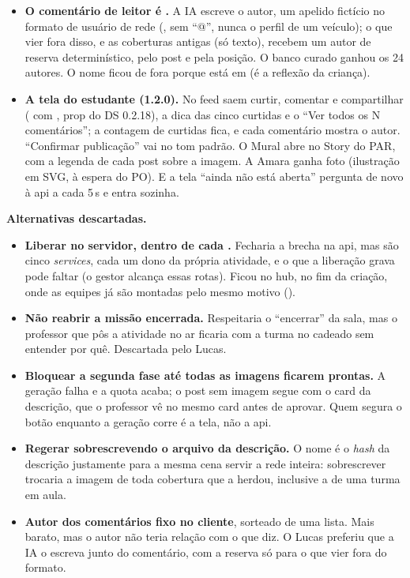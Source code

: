 \begin{itemize}
    Só antes da aprovação (409 ); post de gráfico,
    400 .
  \item \textbf{O comentário de leitor é .} A IA
    escreve o autor, um apelido fictício no formato de usuário de rede
    (, sem \enquote{@}, nunca o perfil de um
    veículo); o que vier fora disso, e as coberturas antigas (só texto),
    recebem um autor de reserva determinístico, pelo post e pela posição. O
    banco curado ganhou os 24 autores. O nome  ficou de fora porque
    está em  (é a reflexão da criança).
  \item \textbf{A tela do estudante (1.2.0).} No feed saem curtir, comentar e
    compartilhar ( com , prop do DS
    0.2.18), a dica das cinco curtidas e o \enquote{Ver todos os N
    comentários}; a contagem de curtidas fica, e cada comentário mostra o
    autor. \enquote{Confirmar publicação} vai no tom padrão. O Mural abre no
    Story do PAR, com a legenda de cada post sobre a imagem. A Amara ganha
    foto (ilustração em SVG, à espera do PO). E a tela \enquote{ainda não está
    aberta} pergunta de novo à api a cada 5\,s e entra sozinha.
\end{itemize}

\textbf{Alternativas descartadas.}

\begin{itemize}
  \item \textbf{Liberar no servidor, dentro de cada .}
    Fecharia a brecha na api, mas são cinco \emph{services}, cada um dono da
    própria atividade, e o  que a liberação grava pode faltar
    (o gestor alcança essas rotas). Ficou no hub, no fim da criação, onde as
    equipes já são montadas pelo mesmo motivo ().
  \item \textbf{Não reabrir a missão encerrada.} Respeitaria o
    \enquote{encerrar} da sala, mas o professor que pôs a atividade no ar
    ficaria com a turma no cadeado sem entender por quê. Descartada pelo
    Lucas.
  \item \textbf{Bloquear a segunda fase até todas as imagens ficarem prontas.}
    A geração falha e a quota acaba; o post sem imagem segue com o card da
    descrição, que o professor vê no mesmo card antes de aprovar. Quem segura o
    botão enquanto a geração corre é a tela, não a api.
  \item \textbf{Regerar sobrescrevendo o arquivo da descrição.} O nome é o
    \emph{hash} da descrição justamente para a mesma cena servir a rede
    inteira: sobrescrever trocaria a imagem de toda cobertura que a herdou,
    inclusive a de uma turma em aula.
  \item \textbf{Autor dos comentários fixo no cliente}, sorteado de uma lista.
    Mais barato, mas o autor não teria relação com o que diz. O Lucas preferiu
    que a IA o escreva junto do comentário, com a reserva só para o que vier
    fora do formato.
\end{itemize}

